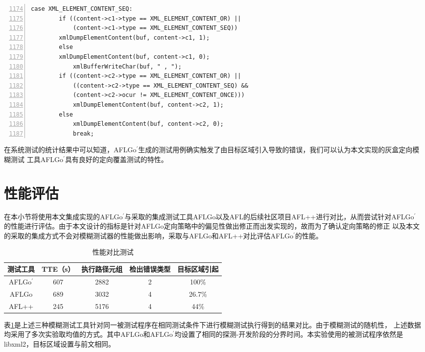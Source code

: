 \documentclass[bachelor]{njupthesis}
\begin{document}
\renewcommand{\thelstlisting}{5.\arabic{lstlisting}}
\begin{lstlisting}[caption={示例错误函数},label={code:bug},numbers=left,firstnumber=1174,numbersep=-2em,numberstyle=\footnotesize ]
	case XML_ELEMENT_CONTENT_SEQ:
		if ((content->c1->type == XML_ELEMENT_CONTENT_OR) ||
			(content->c1->type == XML_ELEMENT_CONTENT_SEQ))
		xmlDumpElementContent(buf, content->c1, 1);
		else
		xmlDumpElementContent(buf, content->c1, 0);
			xmlBufferWriteChar(buf, " , ");
		if ((content->c2->type == XML_ELEMENT_CONTENT_OR) ||
			((content->c2->type == XML_ELEMENT_CONTENT_SEQ) &&
			(content->c2->ocur != XML_ELEMENT_CONTENT_ONCE)))
			xmlDumpElementContent(buf, content->c2, 1);
		else
			xmlDumpElementContent(buf, content->c2, 0);
			break;
\end{lstlisting}

在系统测试的统计结果中可以知道，AFLGo$^\prime$生成的测试用例确实触发了由目标区域引入导致的错误，我们可以认为本文实现的灰盒定向模糊测试
工具AFLGo$^\prime$具有良好的定向覆盖测试的特性。
\section{性能评估}
在本小节将使用本文集成实现的AFLGo$^\prime$与采取的集成测试工具AFLGo以及AFL的后续社区项目AFL++进行对比，从而尝试针对AFLGo$^\prime$
的性能进行评估。由于本文设计的指标是针对AFLGo定向策略中的偏见性做出修正而出发实现的，故而为了确认定向策略的修正
以及本文的采取的集成方式不会对模糊测试器的性能做出影响，采取与AFLGo和AFL++对比评估AFLGo$^\prime$的性能。

\begin{table}[htbp]
	\centering
	\begin{tabular}{|c|c|c|c|c|}
	  \hline
	  测试工具 & TTE（s）&执行路径元组& 检出错误类型 &目标区域引起 \\
	  \hline
	  AFLGo$^\prime$ & 607 & 2882 & 2  & 100\% \\
	  \hline
	  AFLGo & 689 & 3032 & 4  & 26.7\%\\
	  \hline
	  AFL++ & 245 & 5176 & 4  & 44\%\\
	  \hline  
	\end{tabular}
	\caption{性能对比测试}\label{tab:aflgot}
\end{table}

表\ref{tab:aflgot}是上述三种模糊测试工具针对同一被测试程序在相同测试条件下进行模糊测试执行得到的结果对比。由于模糊测试的随机性，
上述数据均采用了多次实验取均值的方式。其中AFLGo和AFLGo$^\prime$均设置了相同的探测-开发阶段的分界时间。本实验使用的被测试程序依然是
libxml2，目标区域设置与前文相同。
\end{document}
